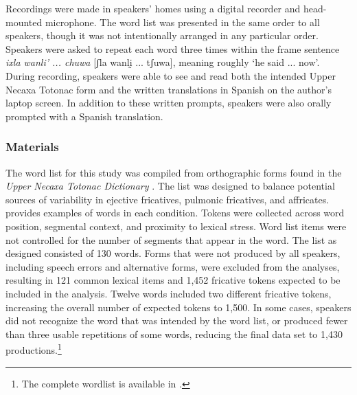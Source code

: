 \documentclass[output=paper,colorlinks,citecolor=brown]{langscibook}
\begin{document}
Recordings were made in speakers' homes using a digital recorder and head-mounted microphone. The word list was presented in the same order to all speakers, though it was not intentionally arranged in any particular order. Speakers were asked to repeat each word three times within the frame sentence \textit{ixla wanli' ... chuwa} {[ʃla wanlḭ ... tʃuwa]}, meaning roughly `he said ... now'. During recording, speakers were able to see and read both the intended Upper Necaxa Totonac form and the written translations in Spanish on the author's laptop screen. In addition to these written prompts, speakers were also orally prompted with a Spanish translation.

\subsubsection{Materials}
The word list for this study was compiled from orthographic forms found in the \textit{Upper Necaxa Totonac Dictionary} \citep{Beck2011}. The list was designed to balance potential sources of variability in ejective fricatives, pulmonic fricatives, and affricates.  provides examples of words in each condition. Tokens were collected across word position, segmental context, and proximity to lexical stress. Word list items were not controlled for the number of segments that appear in the word. The  list as designed consisted of 130 words. Forms that were not produced by all speakers, including speech errors and alternative forms, were excluded from the analyses, resulting in 121 common lexical items and 1,452 fricative tokens expected to be included in the analysis. Twelve words included two different fricative tokens, increasing the overall number of expected tokens to 1,500. In some cases, speakers did not recognize the word that was intended by the word list, or produced fewer than three usable repetitions of some words, reducing the final data set to 1,430 productions.\footnote{The complete wordlist is available in \citet{Puderbaugh2019a}.}
\end{document}
